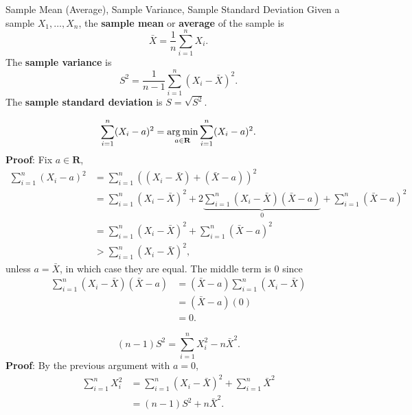 \begin{Definition}{Sample Mean (Average), Sample Variance, Sample Standard Deviation}{}
    Given a sample $ X_1,\ldots,X_n $, the \textbf{sample mean} or \textbf{average} of the sample is
    \[ \bar{X}=\frac{1}{n}\sum_{i=1}^{n}X_i. \]
    The \textbf{sample variance} is
    \[ S^2=\frac{1}{n-1}\sum_{i=1}^{n}(X_i-\bar{X})^2. \]
    The \textbf{sample standard deviation} is $ S=\sqrt{S^2} $.
\end{Definition}
\begin{Theorem}{}{}
    \[ \sum_{i=1}^{n}(X_i-a)^2=\operatorname*{arg\,min}_{a\in\mathbf{R}}\sum_{i=1}^{n}(X_i-a)^2. \]
    \tcblower{}
    \textbf{Proof}: Fix $ a\in\mathbf{R} $,
    \begin{align*}
        \sum_{i=1}^{n}(X_i-a)^2
         & =\sum_{i=1}^{n}((X_i-\bar{X})+(\bar{X}-a))^2                                                                        \\
         & =\sum_{i=1}^{n}(X_i-\bar{X})^2+2\underbrace{\sum_{i=1}^{n}(X_i-\bar{X})(\bar{X}-a)}_{0}+\sum_{i=1}^{n}(\bar{X}-a)^2 \\
         & =\sum_{i=1}^{n}(X_i-\bar{X})^2+\sum_{i=1}^{n}(\bar{X}-a)^2                                                          \\
         & >\sum_{i=1}^{n}(X_i-\bar{X})^2,
    \end{align*}
    unless $ a=\bar{X} $, in which case they are equal. The middle term is $ 0 $ since
    \begin{align*}
        \sum_{i=1}^{n}(X_i-\bar{X})(\bar{X}-a)
         & =(\bar{X}-a)\sum_{i=1}^{n}(X_i-\bar{X}) \\
         & =(\bar{X}-a)(0)                         \\
         & =0.
    \end{align*}
\end{Theorem}
\begin{Theorem}{}{}
    \[ (n-1)S^2=\sum_{i=1}^{n}X_i^2 - n\bar{X}^2. \]
    \tcblower{}
    \textbf{Proof}: By the previous argument with $ a=0 $,
    \begin{align*}
        \sum_{i=1}^{n}X_i^2
         & =\sum_{i=1}^{n}(X_i-\bar{X})^2+\sum_{i=1}^{n}\bar{X}^2 \\
         & =(n-1)S^2+n\bar{X}^2.
    \end{align*}
\end{Theorem}
